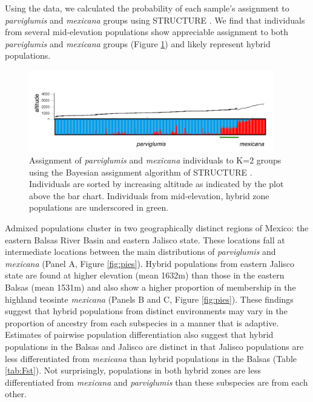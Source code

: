 Using the \citet{Fang2012} data, we calculated the probability of each sample's assignment to \emph{parviglumis} and \emph{mexicana} groups using STRUCTURE \citep{Pritchard2000}.  We find that individuals from several mid-elevation populations show appreciable assignment to both \emph{parviglumis} and \emph{mexicana} groups (Figure \ref{fig:structure}) and likely represent hybrid populations.  

\begin{figure}[h!] 
  \centering
   \includegraphics[width=0.95\textwidth]{structure.pdf}
    \caption{Assignment of \emph{parviglumis} and \emph{mexicana} individuals to K=2 groups using the Bayesian assignment algorithm of STRUCTURE \citep{Pritchard2000}.  Individuals are sorted by increasing altitude as indicated by the plot above the bar chart. Individuals from mid-elevation, hybrid zone populations are underscored in green.} 
\label{fig:structure}
\end{figure}

Admixed populations cluster in two geographically distinct regions of Mexico: the eastern Balsas River Basin and eastern Jalisco state.  These locations fall at intermediate locations between the main distributions of \emph{parviglumis} and \emph{mexicana} (Panel A, Figure \ref{fig:pies}).  Hybrid populations from eastern Jalisco state are found at higher elevation (mean 1632m) than those in the eastern Balsas (mean 1531m) and also show a higher proportion of membership in the highland teosinte \emph{mexicana} (Panels B and C, Figure \ref{fig:pies}).  These findings suggest that hybrid populations from distinct environments may vary in the proportion of ancestry from each subspecies in a manner that is adaptive. Estimates of pairwise population differentiation also suggest that hybrid populations in the Balsas and Jalisco are distinct in that Jalisco populations are less differentiated from \emph{mexicana} than hybrid populations in the Balsas (Table \ref{tab:Fst}).  Not surprisingly, populations in both hybrid zones are less differentiated from \emph{mexicana} and \emph{parviglumis} than these subspecies are from each other. 

